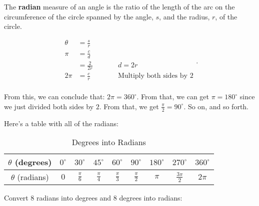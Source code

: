 \begin{definition}[Radian]
  \label{def:radion}

  The \textbf{radian} measure of an angle is the ratio of the length of the arc
  on the circumference of the circle spanned by the angle, $s$, and the radius,
  $r$, of the circle.

  \begin{equation*}
    \label{edt:entire_revolution_using_raidans}
    \begin{alignedat}{3}
      \theta &= \frac{s}{r} \\
      \pi &= \frac{c}{d} \\
          &= \frac{2}{2r} \qquad && \textrm{$d = 2r$} \\
      2\pi &= \frac{c}{r} \qquad && \textrm{Multiply both sides by $2$} \\
    \end{alignedat}
  .\end{equation*}

  From this, we can conclude that: $2\pi = 360^{\circ}$. From that, we can get
  $\pi = 180^{\circ}$ since we just divided both sides by $2$. From that, we get
  $\frac{\pi}{2} = 90^{\circ}$. So on, and so forth.

  Here's a table with all of the radians:

  \begin{table}[H]
    \label{tab:degrees_into_radians}
    \centering

    \begin{tabular}{|c|c|c|c|c|c|c|c|c|}
      \hline
      $\theta$ (degrees) & $0^{\circ}$ & $30^{\circ}$ & $45^{\circ}$ & $60^{\circ}$ & $90^{\circ}$ & $180^{\circ}$ & $270^{\circ}$ & $360^{\circ}$ \\
      \hline
      $\theta$ (radians) & $0$ & $\frac{\pi}{6}$ & $\frac{\pi}{4}$ &
      $\frac{\pi}{3}$ & $\frac{\pi}{2}$ & $\pi$ & $\frac{3\pi}{2}$ & $2\pi$ \\
      \hline
    \end{tabular}

    \caption{Degrees into Radians}
  \end{table}
\end{definition}

\begin{exc}
  \label{exc:convert_8_radians_into_degrees_and_8_into_radians}

  Convert $8$ radians into degrees and $8$ degrees into radians:
\end{exc}

